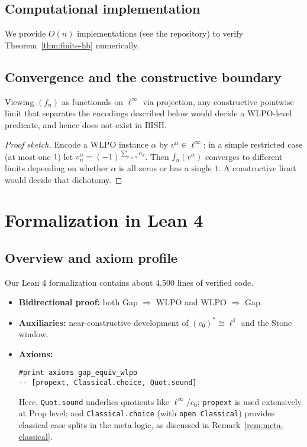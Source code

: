 \documentclass[11pt]{article}
\newcommand{\linf}{\ell^\infty}
\newcommand{\cnull}{c_0}
\newcommand{\WLPO}{\mathrm{WLPO}}
\newcommand{\BISH}{\mathrm{BISH}}
\begin{document}
\subsection{Computational implementation}

We provide $O(n)$ implementations (see the repository) to verify Theorem~\ref{thm:finite-hb} numerically.

\subsection{Convergence and the constructive boundary}

\begin{thm}
Viewing $(f_n)$ as functionals on $\linf$ via projection, any constructive pointwise limit that separates the encodings described below would decide a $\WLPO$-level predicate, and hence does not exist in $\BISH$.
\end{thm}

\begin{proof}[Proof sketch]
Encode a $\WLPO$ instance $\alpha$ by $v^\alpha\in\linf$; in a simple restricted case (at most one $1$) let $v^\alpha_n=(-1)^{\sum_{k\le n}\alpha_k}$. Then $f_n(v^\alpha)$ converges to different limits depending on whether $\alpha$ is all zeros or has a single $1$. A constructive limit would decide that dichotomy.
\end{proof}

\section{Formalization in Lean 4}\label{sec:lean}

\subsection{Overview and axiom profile}\label{sec:axioms}

Our Lean 4 formalization contains about 4{,}500 lines of verified code.
\begin{itemize}
\item \textbf{Bidirectional proof:} both Gap $\Rightarrow$ $\WLPO$ and $\WLPO$ $\Rightarrow$ Gap.
\item \textbf{Auxiliaries:} near-constructive development of $(\cnull)^*\cong \ell^1$ and the Stone window.
\item \textbf{Axioms:}
\begin{lstlisting}[language=Lean,numbers=none]
#print axioms gap_equiv_wlpo
-- [propext, Classical.choice, Quot.sound]
\end{lstlisting}
Here, \texttt{Quot.sound} underlies quotients like $\linf/\cnull$; \texttt{propext} is used extensively at Prop level; and \texttt{Classical.choice} (with \texttt{open Classical}) provides classical case splits in the meta-logic, as discussed in Remark~\ref{rem:meta-classical}.
\end{itemize}
\end{document}
